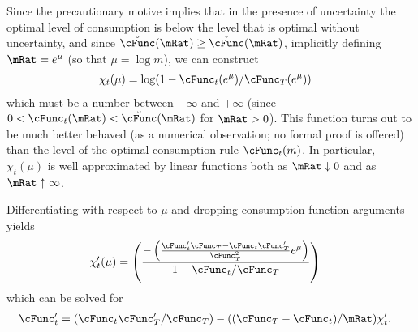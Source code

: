 \documentclass[\econtexRoot/BufferStockTheory]{subfiles}
\begin{document}
Since the precautionary motive implies that in the presence of
uncertainty the optimal level of consumption is below the level that is
optimal without uncertainty, and since $\breve{\cFunc}(\mRat) \geq \mathring{\cFunc}(\mRat)$,
implicitly defining $\mRat = e^{\mu}$ (so that $\mu = \log m$), we can construct
\begin{equation}\begin{gathered}\begin{aligned}
 \chi_{t}(\mu)  & = \log (1-\cFunc_{t}(e^{\mu})/\cFunc_{T}(e^{\mu}))  \label{eq:ChiDef}
\end{aligned}\end{gathered}\end{equation}
which must be a number between $-\infty$ and $+\infty$ (since $0 < \cFunc_{t}(\mRat) < \breve{\cFunc}(\mRat)$ for $\mRat > 0$).  This function turns out to be much better behaved (as
a numerical observation; no formal proof is offered) than the level of the optimal consumption rule $\cFunc_{t}(m)$.  In particular, $\chi_{t}(\mu)$ is well approximated by linear functions both as $\mRat \downarrow 0$ and as $\mRat \uparrow \infty$.

Differentiating with respect to $\mu$ and dropping consumption function arguments
yields
\begin{equation}\begin{gathered}\begin{aligned}
 \chi^{\prime}_{t}(\mu)  & = \left(\frac{-\left(\frac{\cFunc^{\prime}_{t}\cFunc_{T}-\cFunc_{t}\cFunc_{T}^{\prime}}{\cFunc_{T}^{2}}e^{\mu}\right)}{1-\cFunc_{t}/\cFunc_{T}}\right) \label{eq:ChiPDef}
\end{aligned}\end{gathered}\end{equation}
which can be solved for
\begin{equation}\begin{gathered}\begin{aligned}
 \cFunc^{\prime}_{t}  & = (\cFunc_{t}\cFunc_{T}^{\prime}/\cFunc_{T})-((\cFunc_{T}-\cFunc_{t})/\mRat)\chi^{\prime}_{t} \label{eq:cFuncPFromChi}.
\end{aligned}\end{gathered}\end{equation}
\end{document}
